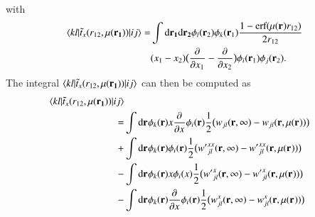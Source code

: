 \documentclass[aip,jcp,reprint,noshowkeys,superscriptaddress]{revtex4-1}
\newcommand{\matelem}[3]{\langle #1 | #2 | #3 \rangle}
\newcommand{\deriv}[3]{\frac{\partial^{#3} #1}{\partial {#2}^{#3}}}
\newcommand{\br}[0]{{\bf {r}}}
\newcommand{\dr}[1]{\text{d}{\bf r_{#1}}}
\newcommand{\mur}[1]{\mu({\bf r_{#1}})}
\begin{document}
with 
\begin{equation}
 \begin{aligned}
  \matelem{kl}{\tilde{t}_x(r_{12},\mur{1})}{ij} = & \int \dr{1} \dr{2} \phi_l(\br_2) \phi_k(\br_1) \frac{1 - \text{erf}(\mur{} r_{12})}{2 r_{12}} \\
& (x_1 - x_2) \big( \deriv{}{x_1}{} - \deriv{}{x_2}{} \big) \phi_i(\br_1) \phi_j(\br_2).
 \end{aligned}
\end{equation}
The integral $\matelem{kl}{\tilde{t}_x(r_{12},\mur{1})}{ij}$ can then be computed as 
\begin{equation}
 \begin{aligned}
 \matelem{kl}{\tilde{t}_x(r_{12},\mur{1})}{ij} \\
  =& \int \dr{} \phi_k(\br) x \deriv{}{x}{} \phi_i(\br) \frac{1}{2}\big(w_{jl}(\br,\infty) - w_{jl}(\br,\mur{})\big) \\
  +& \int \dr{} \phi_k(\br) \phi_i(\br) \frac{1}{2}\big({w'}_{jl}^{xx}(\br,\infty) - {w'}_{jl}^{xx}(\br,\mur{})\big) \\
  -& \int \dr{} \phi_k(\br) x \phi_i(x) \frac{1}{2} \big( {w'}_{jl}^x(\br,\infty) - {w'}_{jl}^x(\br,\mur{}) \big) \\
  -& \int \dr{} \phi_k(\br) \deriv{}{x}{} \phi_i(\br) \frac{1}{2} \big( {w}_{jl}^x(\br,\infty) - {w}_{jl}^x(\br,\mur{}) \big)
 \end{aligned}
\end{equation}


\end{document}
